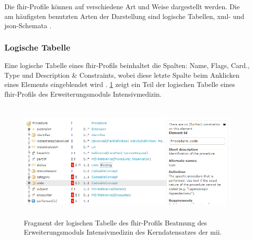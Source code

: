 Die \ac{fhir}-Profile können auf verschiedene Art und Weise dargestellt werden. Die am häufigsten benutzten Arten der Darstellung sind logische Tabellen, \ac{xml}- und \ac{json}-Schemata \cite{fhirformat}.

\subsubsection{Logische Tabelle} \label{subsubsec:logtab}

Eine logische Tabelle eines \ac{fhir}-Profils beinhaltet die Spalten: Name, Flags, Card., Type und Description \& Constraints, wobei diese letzte Spalte beim Anklicken eines Elements eingeblendet wird \cite{fhirformat}. \ref{fig:logic-table} zeigt ein Teil der logischen Tabelle eines \ac{fhir}-Profils des Erweiterungsmoduls \glqq Intensivmedizin\grqq{}.

\begin{figure}[ht]
	\centering
	\includegraphics[height=6cm]{figures/beatmung}
	\caption[Logische Tabelle eines \acs{fhir}-Profils]{Fragment der logischen Tabelle des \acs{fhir}-Profils \glqq Beatmung\grqq{} des Erweiterungsmoduls \glqq Intensivmedizin\grqq{} des Kerndatensatzes der \acs{mii}.}
	\label{fig:logic-table}
\end{figure}

